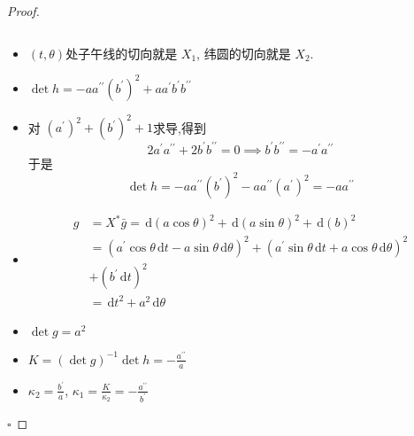 \documentclass[../../几何与拓扑.tex]{subfiles}
\begin{document}
\begin{proof}
\begin{itemize}
\[            \]  
            \item   \(  \left( t, \theta  \right)   \)处子午线的切向就是 \(  X_1  \),  纬圆的切向就是 \(  X_2  \).
            \item  \(  \det h= -a a^{\prime \prime} \left( b^{\prime}  \right)^{2} + a a^{\prime} b^{\prime}  b^{\prime \prime}     \)     
            \item 对 \(  \left( a^{\prime}  \right)^{2}+ \left( b^{\prime}  \right)^{2}+ 1    \)求导,得到  \[
            2a^{\prime}  a^{\prime \prime} + 2b^{\prime} b^{\prime \prime} = 0\implies  b^{\prime} b^{\prime \prime} = -a^{\prime} a^{\prime \prime} 
            \]于是 \[
            \det h= -a a^{\prime \prime} \left( b^{\prime}  \right)^{2}-a a^{\prime \prime} \left( a^{\prime}  \right)^{2} =  -a a^{\prime \prime}    
            \] 
            
            \item \[
         \begin{aligned}
            g &=  X^{*} \bar{g}= \,\mathrm{d} \left( a\cos  \theta  \right)^{2}+ \,\mathrm{d} \left( a\sin  \theta  \right)^{2}+ \,\mathrm{d} \left( b \right)^{2}   \\ 
             &=  \left( a^{\prime} \cos  \theta \,\mathrm{d} t-a\sin  \theta \,\mathrm{d}  \theta  \right)^{2}+  \left( a^{\prime} \sin  \theta \,\mathrm{d} t+ a\cos  \theta \,\mathrm{d}  \theta  \right)^{2}\\ 
              &+ \left( b^{\prime} \,\mathrm{d} t \right)^{2}\\ 
               &= \,\mathrm{d} t^{2}+ a^{2}\,\mathrm{d}  \theta    
         \end{aligned}
            \]
            \item \(  \det g =  a^{2}  \)
            \item \(  K=  \left( \det g \right)^{-1} \det h= - \frac{a^{\prime \prime}  }{a }    \)  
 \item \(   \kappa _2 = \frac{b^{\prime}  }{a }   \), \(   \kappa _1 =  \frac{K}{ \kappa _2 }= - \frac{a^{\prime \prime}  }{b^{\prime}  }   \)  
    \end{itemize}
    

    \hfill $\square$
\end{proof}

\hspace*{\fill} 
\end{document}
